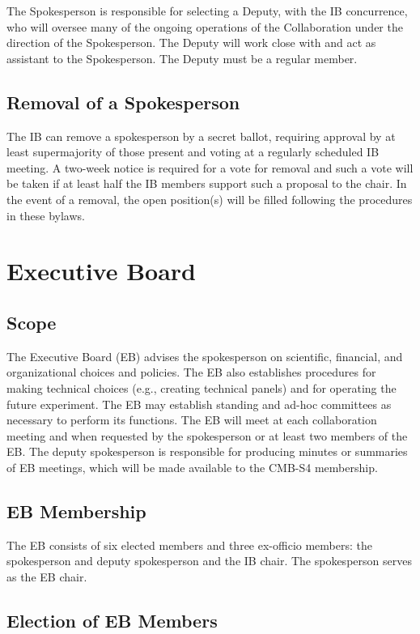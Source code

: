 \documentclass[12pt]{article}
\begin{document}
The Spokesperson is responsible for selecting a Deputy, with the IB concurrence, who will oversee many of the ongoing operations of the Collaboration under the direction of the Spokesperson. The Deputy will work close with and act as assistant to the Spokesperson. The Deputy must be a regular member.

\subsection{Removal of a Spokesperson}

The IB can remove a spokesperson by a secret ballot, requiring approval by at least supermajority of those present and voting at a regularly scheduled IB meeting. A two-week notice is required for a vote for removal and such a vote will be taken if at least half the IB members support such a proposal to the chair. In the event of a removal, the open position(s) will be filled following the procedures in these bylaws.

\section{Executive Board}

\subsection{Scope}

The Executive Board (EB) advises the spokesperson on scientific, financial, and organizational choices and policies. The EB also establishes procedures for making technical choices (e.g., creating technical panels) and for operating the future experiment. The EB may establish standing and ad-hoc committees as necessary to perform its functions. The EB will meet at each collaboration meeting and when requested by the spokesperson or at least two members of the EB. The deputy spokesperson is responsible for producing minutes or summaries of EB meetings, which will be made available to the CMB-S4 membership.

\subsection{EB Membership}

The EB consists of six elected members and three ex-officio members: the spokesperson and deputy spokesperson and the IB chair. The spokesperson serves as the EB chair.

\subsection{Election of EB Members}
\end{document}
